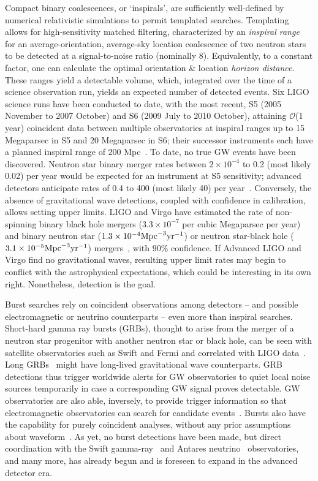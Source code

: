 Compact binary coalescences, or `inspirals', are sufficiently well-defined by numerical relativistic simulations to permit templated searches.
Templating allows for high-sensitivity matched filtering, characterized by an \textit{inspiral range}~\cite{FinnInspiral1993} for an average-orientation, average-sky location coalescence of two neutron stars to be detected at a signal-to-noise ratio (nominally 8).
Equivalently, to a constant factor, one can calculate the optimal orientation \& location \textit{horizon distance}.
These ranges yield a detectable volume, which, integrated over the time of a science observation run, yields an expected number of detected events.
Six LIGO science runs have been conducted to date, with the most recent, S5 (2005 November to 2007 October) and S6 (2009 July to 2010 October), attaining $\mathcal{O}$(1 year) coincident data between multiple observatories at inspiral ranges up to 15 Megaparsec in S5 and 20 Megaparsec in S6; their successor instruments each have a planned inspiral range of 200 Mpc~\cite{HarryALIGO2010}.
To date, no true GW events have been discovered.
Neutron star binary merger rates between $2\times 10^{-4}$ to 0.2 (most likely 0.02) per year would be expected for an instrument at S5 sensitivity; advanced detectors anticipate rates of 0.4 to 400 (most likely 40) per year~\cite{AbadieRates2010}.
Conversely, the absence of gravitational wave detections, coupled with confidence in calibration, allows setting upper limits.
LIGO and Virgo have estimated the rate of non-spinning binary black hole mergers ($3.3\times10^{-7}$ per cubic Megaparsec per year)~\cite{AasiBBH2013} and binary neutron star ($1.3\times10^{-4} \textup{Mpc}^{-3} \textup{yr}^{-1}$) or neutron star-black hole ($3.1\times10^{-5} \textup{Mpc}^{-3} \textup{yr}^{-1}$) mergers~\cite{AbadieCBC2012}, with 90\% confidence.
If Advanced LIGO and Virgo find no gravitational waves, resulting upper limit rates may begin to conflict with the astrophysical expectations, which could be interesting in its own right.
Nonetheless, detection is the goal.

Burst searches rely on coincident observations among detectors -- and possible electromagnetic or neutrino counterparts -- even more than inspiral searches.
Short-hard gamma ray bursts (GRBs), thought to arise from the merger of a neutron star progenitor with another neutron star or black hole, can be seen with satellite observatories such as Swift and Fermi and correlated with LIGO data~\cite{AbadieGRB2012}.
Long GRBs~\cite{AasiGRB2013} might have long-lived gravitational wave counterparts.
GRB detections thus trigger worldwide alerts for GW observatories to quiet local noise sources temporarily in case a corresponding GW signal proves detectable.
GW observatories are also able, inversely, to provide trigger information so that electromagnetic observatories can search for candidate events~\cite{AasiOpticalCounterpart2014}.
Bursts also have the capability for purely coincident analyses, without any prior assumptions about waveform~\cite{LIGOBurst2012}.
As yet, no burst detections have been made, but direct coordination with the Swift gamma-ray~\cite{Swift2012} and Antares neutrino~\cite{Antares2013} observatories, and many more, has already begun and is foreseen to expand in the advanced detector era.

